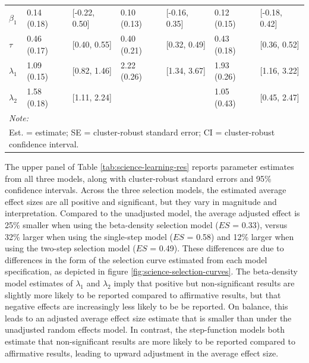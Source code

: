 \documentclass[
  man, donotrepeattitle,floatsintext]{apa7}
\begin{document}
\begin{table}
\begin{tabular}[t]{lllllll}
\hspace{1em}$\beta_1$ & 0.14 (0.18) & {}[-0.22, 0.50] & 0.10 (0.13) & {}[-0.16, 0.35] & 0.12 (0.15) & {}[-0.18, 0.42]\\
\hspace{1em}$\tau$ & 0.46 (0.17) & {}[0.40, 0.55] & 0.40 (0.21) & {}[0.32, 0.49] & 0.43 (0.18) & {}[0.36, 0.52]\\
\hspace{1em}$\lambda_1$ & 1.09 (0.15) & {}[0.82, 1.46] & 2.22 (0.26) & {}[1.34, 3.67] & 1.93 (0.26) & {}[1.16, 3.22]\\
\hspace{1em}$\lambda_2$ & 1.58 (0.18) & {}[1.11, 2.24] &  &  & 1.05 (0.43) & {}[0.45, 2.47]\\
\bottomrule
\multicolumn{7}{l}{\rule{0pt}{1em}\textit{Note: }}\\
\multicolumn{7}{l}{\rule{0pt}{1em}Est. = estimate; SE = cluster-robust standard error; CI = cluster-robust confidence interval.}\\
\end{tabular}
\end{table}

The upper panel of Table \ref{tab:science-learning-res} reports parameter estimates from all three models, along with cluster-robust standard errors and 95\% confidence intervals.
Across the three selection models, the estimated average effect sizes are all positive and significant, but they vary in magnitude and interpretation. Compared to the unadjusted model, the average adjusted effect is 25\% smaller when using the beta-density selection model (\(ES\) = 0.33), versus 32\% larger when using the single-step model (\(ES\) = 0.58) and 12\% larger when using the two-step selection model (\(ES\) = 0.49).
These differences are due to differences in the form of the selection curve estimated from each model specification, as depicted in figure \ref{fig:science-selection-curves}.
The beta-density model estimates of \(\lambda_1\) and \(\lambda_2\) imply that positive but non-significant results are slightly more likely to be reported compared to affirmative results, but that negative effects are increasingly less likely to be be reported.
On balance, this leads to an adjusted average effect size estimate that is smaller than under the unadjusted random effects model.
In contrast, the step-function models both estimate that non-significant results are more likely to be reported compared to affirmative results, leading to upward adjustment in the average effect size.
\end{document}
